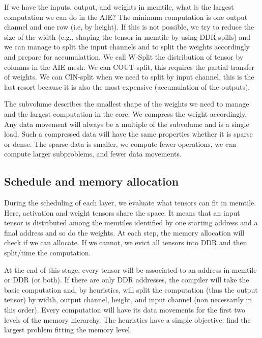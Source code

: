 \documentclass[sigconf]{acmart}
\begin{document}
If we have the inputs, output, and weights in memtile, what is the
largest computation we can do in the AIE? The minimum computation is
one output channel and one row (i.e, by height). If this is not
possible, we try to reduce the size of the width (e.g., shaping the
tensor in memtile by using DDR spills) and we can manage to split the
input channels and to split the weights accordingly and prepare for
accumulattion. We call W-Split the distribution of tensor by columns
in the AIE mesh. We can COUT-split, this requires the partial transfer
of weights.  We can CIN-split when we need to split by input channel,
this is the last resort because it is also the most expensive
(accumulation of the outputs).

The subvolume describes the smallest shape of the weights we need to
manage and the largest computation in the core. We compress the weight
accordingly. Any data movement will always be a multiple of the
subvolume and is a single load. Such a compressed data will have the
same properties whether it is sparse or dense. The sparse data is
smaller, we compute fewer operations, we can compute larger
subproblems, and fewer data movements.


\subsection{Schedule and memory allocation}
During the scheduling of each layer, we evaluate what tensors can fit
in memtile. Here, activation and weight tensors share the space. It
means that an input tensor is distributed among the memtiles
identified by one starting address and a final address and so do the
weights. At each step, the memory allocation will check if we can
allocate. If we cannot, we evict all tensors into DDR and then
split/time the computation.

At the end of this stage, every tensor will be associated to an
address in memtile or DDR (or both). If there are only DDR addresses,
the compiler will take the basic computation and, by heuristics, will
split the computation (thus the output tensor) by width, output
channel, height, and input channel (non necessarily in this
order). Every computation will have its data movements for the first
two levels of the memory hierarchy. The heuristics have a simple
objective: find the largest problem fitting the memory level.
\end{document}
